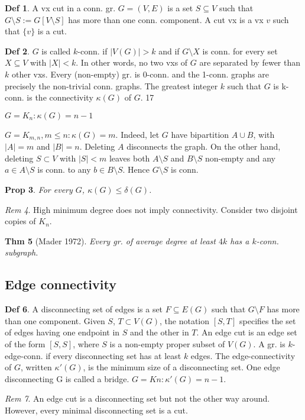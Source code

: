 \documentclass[11pt, fleqn, a4paper, landscape]{article}
\theoremstyle{plain} %
\newtheorem{thm}{Thm}
\newtheorem{pro}[thm]{Prop}
\theoremstyle{remark} %
\newtheorem{rem}[thm]{Rem}
\theoremstyle{definition} %
\newtheorem{defi}[thm]{Def}
\begin{document}
\begin{multicols}{5}
\begin{defi}
A vx cut in a conn. gr. $G = (V,E)$ is a set $ S \subseteq V$ such that $G\setminus S := G[V \setminus S]$ has more than one conn. component. A cut vx is a vx $v$ such that $\{v\}$ is a cut.
\end{defi}
\begin{defi}
$G$ is called $k$-conn. if $|V (G)|> k$ and if $G\setminus X$ is conn. for every set $X \subseteq V$ with $|X|< k$. In other words, no two vxs of $G$ are separated by fewer than $k$ other vxs. Every (non-empty) gr. is 0-conn. and the 1-conn. graphs are precisely the non-trivial conn. graphs. The greatest integer $k$ such that $G$ is k-conn. is the connectivity $\kappa (G)$ of $G$.
17
\item $G = K_n: \kappa (G) = n - 1$
\item $G = K_{m,n}, m \le n: \kappa (G) = m$. Indeed, let $G$ have bipartition $A \cup B$, with $|A|= m$  and $|B|= n$. Deleting $A$ disconnects the graph. On the other hand, deleting $S \subset V$ with $|S|< m$ leaves both $A\setminus S$ and $B\setminus S$ non-empty and any $a \in A\setminus S$ is conn. to any $b \in B \setminus S$. Hence $G\setminus S$ is conn.
\end{defi}
\begin{pro}
For every $G$, $\kappa (G) \le \delta(G)$.
\end{pro} 

\begin{rem}
High minimum degree does not imply connectivity. Consider two disjoint copies of $K_n$.
\end{rem}
\begin{thm}[Mader 1972]
Every gr. of average degree at least $4k$ has a $k$-conn. subgraph.
\end{thm}

\subsection{Edge connectivity}
\begin{defi}
A disconnecting set of edges is a set $F \subseteq E(G)$ such that $G\setminus F$ has more than one component. Given $S$, $T \subset V (G)$, the notation $[S, T]$ specifies the set of edges having one endpoint
in $S$ and the other in $T$. An edge cut is an edge set of the form $[S, S]$, where $S$ is a non-empty proper subset of $V (G)$. A gr. is $k$-edge-conn. if every disconnecting set has at least $k$ edges.
The edge-connectivity of $G$, written $\kappa'(G)$, is the minimum size of a disconnecting set. One edge disconnecting G is called a bridge.
$G = Kn: \kappa'(G) = n - 1.$
\end{defi}
\addtocounter{thm}{1}
\begin{rem}
An edge cut is a disconnecting set but not the other way around. However, every minimal disconnecting set is a cut.
\end{rem}


\end{multicols}
\end{document}
